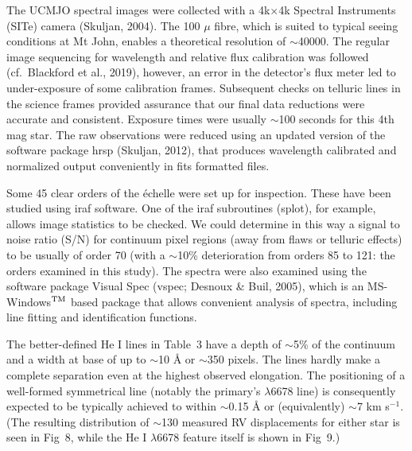 \documentclass[useAMS,usenatbib]{mnras}                                                                           \usepackage[pdftex]{graphicx}
\begin{document}
The UCMJO spectral images were collected with a
 4k$\times$4k Spectral Instruments (SITe) camera (Skuljan, 2004).
The 100 $\mu$ fibre, which is suited to typical
seeing conditions at Mt John, enables a theoretical resolution of $\sim$40000.
The regular image sequencing for wavelength and relative flux calibration was followed
(cf.\ Blackford et al., 2019), however,
an error in the detector's flux meter led to under-exposure 
of some calibration frames.  Subsequent checks on telluric lines in the science 
frames provided assurance that our final data reductions were accurate and consistent.
Exposure times were usually $\sim$100 seconds for this 4th mag star. 
 The raw observations were reduced using an updated version of the software package {\sc hrsp}
(Skuljan, 2012), that produces wavelength calibrated and normalized
 output conveniently in {\sc fits} formatted files.

 Some 45 clear orders of the \'{e}chelle were set up for inspection. 
These have been studied using  {\sc iraf} software. 
 One of the {\sc iraf} subroutines ({\sc splot}), for example,
allows image statistics to be checked.  We could determine in this way
a signal to noise ratio (S/N) for continuum pixel regions (away from
flaws or telluric effects) to be usually of order 70 (with a 
$\sim$10\% deterioration from orders 85 to 121: the orders 
examined in this study). 
The spectra were also examined using the software package 
Visual Spec ({\sc vspec}; Desnoux \& Buil, 2005), which
is an MS-Windows$^{\rm TM}$ based package that allows convenient analysis of spectra, 
including line fitting and identification functions.

The better-defined He I lines in Table~3 have a depth of
$\sim$5\% of the continuum and a width at base of up to $\sim$10 {\AA} or
$\sim$350 pixels. The lines hardly make a complete separation
 even at
the highest observed elongation. The positioning of a well-formed symmetrical 
line (notably the primary's $\lambda$6678 line)
is consequently expected to be typically achieved to within $\sim$0.15 {\AA}
or (equivalently) $\sim$7 km s$^{-1}$. (The resulting distribution of $\sim$130 measured 
RV displacements for either star is seen in Fig~8, while
the He I $\lambda$6678 feature itself is shown in Fig~9.)
 
\end{document}
